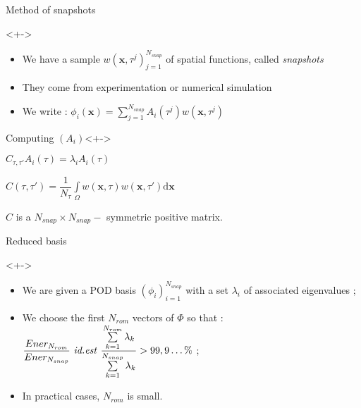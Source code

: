 \begin{frame}{Method of snapshots}
%
\begin{block}{}<+->
\begin{itemize}
\item<+-> We have a sample $w(\mathbf{x},\tau^j)_{j=1}^{N_{snap}}$ of spatial functions, called \emph{snapshots}
\item<+-> They come from experimentation or numerical simulation
\item<+-> We write : $\phi_i(\mathbf{x})=\sum\limits_{j=1}^{N_{snap}}A_i(\tau^j) w(\mathbf{x},\tau^j)$
\end{itemize}
\end{block}
%
\begin{block}{Computing $(A_i)$}<+->%
%
\begin{description}
\item<+-> [Eigenvalue problem] $C_{\tau,\tau'}A_i(\tau)=\lambda_i A_i(\tau)$
\item<+-> [Time-correlation tensor] $C(\tau,\tau ')=\dfrac{1}{N_{\tau}}\int\limits_{\Omega} w(\mathbf{x},\tau)w(\mathbf{x},\tau')\text{d}\mathbf{x}$
\item<+-> $C$ is a $N_{snap}\times N_{snap}-$ symmetric positive matrix.
\end{description}
%
\end{block}
%
\end{frame}

\begin{frame}{Reduced basis}
%
\begin{block}{}<+->
\begin{itemize}
\item<+-> We are given a POD basis $(\phi_i)_{i=1}^{N_{snap}}$ with a set $\lambda_i$ of associated eigenvalues ;
\item<+-> We choose the first $N_{rom}$ vectors of $\Phi$ so that : %
$\dfrac{Ener_{N_{rom}}}{Ener_{N_{snap}}}\text{ \textit{id.est} }\dfrac{\sum\limits_{k=1}^{N_{rom}}\lambda_k}{\sum\limits_{k=1}^{N_{snap}}\lambda_k} >99,9\dots \%$ ;
\item<+-> In practical cases, $N_{rom}$ is small.
\end{itemize}
\end{block}
%
\end{frame}


